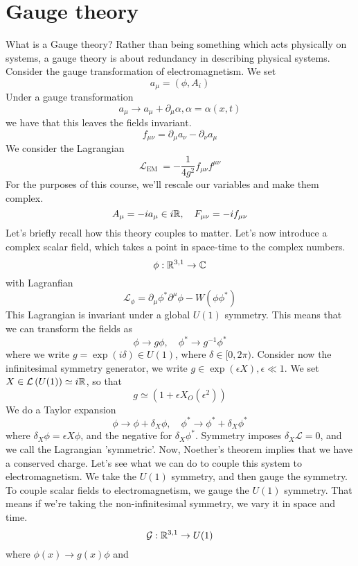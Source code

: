 \section{Gauge theory} 
What is a Gauge theory? Rather than 
being something which acts physically on systems, 
a gauge theory is about redundancy in describing physical systems. 
Consider the gauge transformation of electromagnetism. We set 
\[
 a _ \mu = \left( \phi , A_i  \right)  
\] Under a gauge transformation
\[
	a _ \mu \to a _ \mu + \partial  _ \mu \alpha , \alpha = \alpha \left( x, t  \right) 
\] we have that this leaves the fields 
invariant. 
\[
 f _{ \mu \nu }  = \partial  _ \mu a _ \nu - \partial  _ \nu a _ \mu 
\] We consider the Lagrangian
\[
 \mathcal{ L } _{ \text{EM } }  = - \frac{1}{4 g ^ 2 } f _{ \mu \nu }f ^{ \mu \nu  } 
\] For the purposes of this course, 
we'll rescale our variables and make them complex. 
\[
 A _ \mu  =  -i a _ \mu \in i \mathbb{R} , \quad F _{ \mu \nu }  = - i f _{ \mu \nu } 
\] Let's briefly recall 
how this theory couples to matter. 
Let's now introduce a complex scalar field, which 
takes a point in space-time to the complex numbers. 
\[
 \phi : \mathbb{R} ^{ 3, 1 } \to \mathbb{C} 
\] with Lagranfian 
\[
 \mathcal{ L } _{ \phi }  = \partial  _ \mu \phi ^ * \partial  ^ \mu \phi 
  - W \left( \phi \phi ^ *  \right) 
\] This Lagrangian is invariant under a global $ U ( 1) $
symmetry. This means that we 
can transform the fields as 
\[
 \phi \to g \phi , \quad \phi ^ * \to g ^{ - 1 } \phi ^ * 
\] where we write $ g = \exp \left(  i \delta  \right)  \in U ( 1) $, 
where  $ \delta \in [ 0 , 2 \pi )  $. 
Consider now the infinitesimal symmetry generator, 
we write $ g \in \exp \left( \epsilon X  \right)  , \epsilon \ll 1 $. 
We set $ X \in \mathcal{ L } \left( U ( 1)  \right) \simeq i \mathbb{R} $, 
so that 
\[
	g \simeq \left(  1 + \epsilon X _ O ( \epsilon ^ 2 )  \right) 
\] 
We do a Taylor expansion
\[
 \phi \to \phi + \delta _ X \phi, \quad \phi ^ * \to \phi ^ * + \delta _{ X } \phi ^ * 
\] where $ \delta _ X \phi  = \epsilon X \phi $, and the negative 
for $ \delta _ X \phi ^ * $. 
Symmetry imposes $ \delta _ X \mathcal{ L }  = 0 $, 
and we call the Lagrangian 'symmetric'. 
Now, Noether's theorem 
implies that we have a conserved charge. 
Let's see what we can do to couple this system 
to electromagnetism. We take the $ U ( 1 ) $ symmetry, 
and then gauge the symmetry. To couple scalar fields 
to electromagnetism, we gauge the $ U ( 1 ) $ symmetry. 
That means if we're taking the non-infinitesimal symmetry, 
we vary it in space and time.
\[
	\mathcal{ G } : \mathbb{R} ^{ 3,  1} \to U ( 1 ) 
\] where $ \phi (x ) \to g ( x ) \phi $ and 
